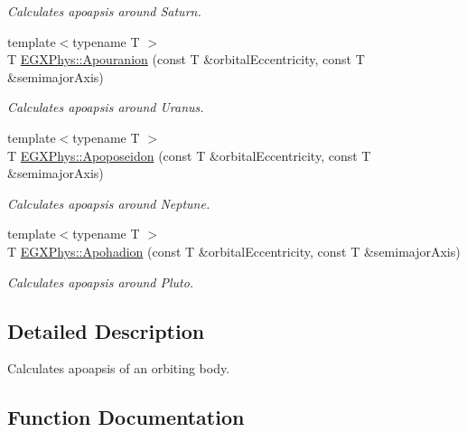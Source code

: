 \begin{DoxyCompactItemize}
\begin{DoxyCompactList}\small\item\em Calculates apoapsis around Saturn. \end{DoxyCompactList}\item 
{\footnotesize template$<$typename T $>$ }\\T \mbox{\hyperlink{group___e_g_x_phys-_apoapsis_ga6efaf5c9379f1085fa6e51bf97356124}{E\+G\+X\+Phys\+::\+Apouranion}} (const T \&orbital\+Eccentricity, const T \&semimajor\+Axis)
\begin{DoxyCompactList}\small\item\em Calculates apoapsis around Uranus. \end{DoxyCompactList}\item 
{\footnotesize template$<$typename T $>$ }\\T \mbox{\hyperlink{group___e_g_x_phys-_apoapsis_ga89679654fff13176e989536163a27f9d}{E\+G\+X\+Phys\+::\+Apoposeidon}} (const T \&orbital\+Eccentricity, const T \&semimajor\+Axis)
\begin{DoxyCompactList}\small\item\em Calculates apoapsis around Neptune. \end{DoxyCompactList}\item 
{\footnotesize template$<$typename T $>$ }\\T \mbox{\hyperlink{group___e_g_x_phys-_apoapsis_gaa16847ddc5763c327067075dcb6a3353}{E\+G\+X\+Phys\+::\+Apohadion}} (const T \&orbital\+Eccentricity, const T \&semimajor\+Axis)
\begin{DoxyCompactList}\small\item\em Calculates apoapsis around Pluto. \end{DoxyCompactList}\end{DoxyCompactItemize}


\subsection{Detailed Description}
Calculates apoapsis of an orbiting body. 

\subsection{Function Documentation}
\mbox{\label{group___e_g_x_phys-_apoapsis_ga2fc1c406ce10f59b4f325150aecd279a}} 
